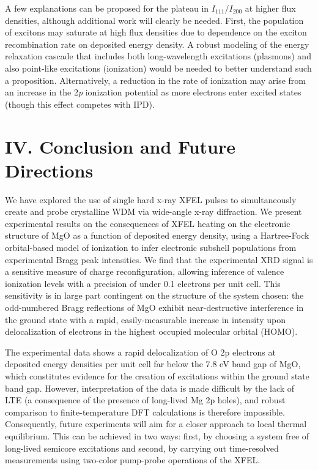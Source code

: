 A few explanations can be proposed for the plateau in
\(I_{111}/I_{200}\) at higher flux densities, although additional work
will clearly be needed. First, the population of excitons may saturate
at high flux densities due to dependence on the exciton recombination
rate on deposited energy density. A robust modeling of the energy
relaxation cascade that includes both long-wavelength excitations
(plasmons) and also point-like excitations (ionization) would be needed
to better understand such a proposition. Alternatively, a reduction in
the rate of ionization may arise from an increase in the 2\emph{p}
ionization potential as more electrons enter excited states (though this
effect competes with IPD).

\section{IV. Conclusion and Future Directions}

We have explored the use of single hard x-ray XFEL pulses to
simultaneously create and probe crystalline WDM via wide-angle x-ray
diffraction. We present experimental results on the consequences of XFEL
heating on the electronic structure of MgO as a function of deposited
energy density, using a Hartree-Fock orbital-based model of ionization
to infer electronic subshell populations from experimental Bragg peak
intensities. We find that the experimental XRD signal is a sensitive
measure of charge reconfiguration, allowing inference of valence
ionization levels with a precision of under 0.1 electrons per unit cell.
This sensitivity is in large part contingent on the structure of the
system chosen: the odd-numbered Bragg reflections of MgO exhibit
near-destructive interference in the ground state with a rapid,
easily-measurable increase in intensity upon delocalization of electrons
in the highest occupied molecular orbital (HOMO).

The experimental data shows a rapid delocalization of O 2p electrons at
deposited energy densities per unit cell far below the 7.8 eV band gap
of MgO, which constitutes evidence for the creation of excitations
within the ground state band gap. However, interpretation of the data is
made difficult by the lack of LTE (a consequence of the presence of
long-lived Mg 2p holes), and robust comparison to finite-temperature DFT
calculations is therefore impossible. Consequently, future experiments
will aim for a closer approach to local thermal equilibrium. This can be
achieved in two ways: first, by choosing a system free of long-lived
semicore excitations and second, by carrying out time-resolved
measurements using two-color pump-probe operations of the XFEL.


